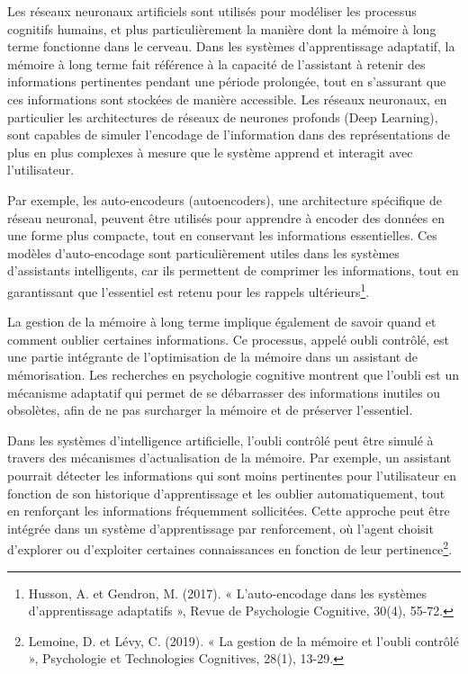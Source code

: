 \documentclass[11pt,a4paper]{report}
\begin{document}
Les réseaux neuronaux artificiels sont utilisés pour modéliser les processus cognitifs humains, et plus particulièrement la manière dont la mémoire à long terme fonctionne dans le cerveau. Dans les systèmes d’apprentissage adaptatif, la mémoire à long terme fait référence à la capacité de l’assistant à retenir des informations pertinentes pendant une période prolongée, tout en s’assurant que ces informations sont stockées de manière accessible. Les réseaux neuronaux, en particulier les architectures de réseaux de neurones profonds (Deep Learning), sont capables de simuler l’encodage de l’information dans des représentations de plus en plus complexes à mesure que le système apprend et interagit avec l’utilisateur.

Par exemple, les auto-encodeurs (autoencoders), une architecture spécifique de réseau neuronal, peuvent être utilisés pour apprendre à encoder des données en une forme plus compacte, tout en conservant les informations essentielles. Ces modèles d'auto-encodage sont particulièrement utiles dans les systèmes d’assistants intelligents, car ils permettent de comprimer les informations, tout en garantissant que l’essentiel est retenu pour les rappels ultérieurs\footnote{Husson, A. et Gendron, M. (2017). « L’auto-encodage dans les systèmes d’apprentissage adaptatifs », Revue de Psychologie Cognitive, 30(4), 55-72.}.

La gestion de la mémoire à long terme implique également de savoir quand et comment oublier certaines informations. Ce processus, appelé oubli contrôlé, est une partie intégrante de l’optimisation de la mémoire dans un assistant de mémorisation. Les recherches en psychologie cognitive montrent que l’oubli est un mécanisme adaptatif qui permet de se débarrasser des informations inutiles ou obsolètes, afin de ne pas surcharger la mémoire et de préserver l’essentiel.

Dans les systèmes d’intelligence artificielle, l’oubli contrôlé peut être simulé à travers des mécanismes d’actualisation de la mémoire. Par exemple, un assistant pourrait détecter les informations qui sont moins pertinentes pour l’utilisateur en fonction de son historique d’apprentissage et les oublier automatiquement, tout en renforçant les informations fréquemment sollicitées. Cette approche peut être intégrée dans un système d’apprentissage par renforcement, où l’agent choisit d’explorer ou d’exploiter certaines connaissances en fonction de leur pertinence\footnote{Lemoine, D. et Lévy, C. (2019). « La gestion de la mémoire et l'oubli contrôlé », Psychologie et Technologies Cognitives, 28(1), 13-29.}.
\end{document}
